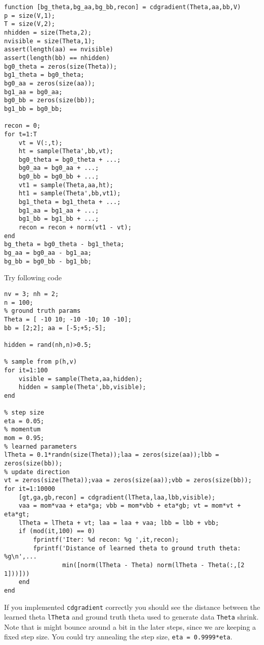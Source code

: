 \documentclass{article}
\begin{document}
\begin{verbatim}
function [bg_theta,bg_aa,bg_bb,recon] = cdgradient(Theta,aa,bb,V)
p = size(V,1);
T = size(V,2);
nhidden = size(Theta,2);
nvisible = size(Theta,1);
assert(length(aa) == nvisible)
assert(length(bb) == nhidden)
bg0_theta = zeros(size(Theta));
bg1_theta = bg0_theta;
bg0_aa = zeros(size(aa));
bg1_aa = bg0_aa;
bg0_bb = zeros(size(bb));
bg1_bb = bg0_bb;

recon = 0;
for t=1:T
    vt = V(:,t);
    ht = sample(Theta',bb,vt);
    bg0_theta = bg0_theta + ...;
    bg0_aa = bg0_aa + ...;
    bg0_bb = bg0_bb + ...;
    vt1 = sample(Theta,aa,ht);
    ht1 = sample(Theta',bb,vt1);
    bg1_theta = bg1_theta + ...;
    bg1_aa = bg1_aa + ...;
    bg1_bb = bg1_bb + ...;
    recon = recon + norm(vt1 - vt);
end
bg_theta = bg0_theta - bg1_theta;
bg_aa = bg0_aa - bg1_aa;
bg_bb = bg0_bb - bg1_bb;
\end{verbatim}




Try following code
\begin{verbatim}
nv = 3; nh = 2;
n = 100;
% ground truth params
Theta = [ -10 10; -10 -10; 10 -10];
bb = [2;2]; aa = [-5;+5;-5];

hidden = rand(nh,n)>0.5;

% sample from p(h,v)
for it=1:100
    visible = sample(Theta,aa,hidden);
    hidden = sample(Theta',bb,visible);
end

% step size
eta = 0.05;
% momentum
mom = 0.95;
% learned parameters
lTheta = 0.1*randn(size(Theta));laa = zeros(size(aa));lbb = zeros(size(bb));
% update direction
vt = zeros(size(Theta));vaa = zeros(size(aa));vbb = zeros(size(bb));
for it=1:10000
    [gt,ga,gb,recon] = cdgradient(lTheta,laa,lbb,visible);
    vaa = mom*vaa + eta*ga; vbb = mom*vbb + eta*gb; vt = mom*vt + eta*gt;
    lTheta = lTheta + vt; laa = laa + vaa; lbb = lbb + vbb;
    if (mod(it,100) == 0)
        fprintf('Iter: %d recon: %g ',it,recon);
        fprintf('Distance of learned theta to ground truth theta: %g\n',...
                min([norm(lTheta - Theta) norm(lTheta - Theta(:,[2 1]))]))
    end
end
\end{verbatim}

If you implemented \verb|cdgradient| correctly you should see the distance between the
learned theta \verb|lTheta| and ground truth theta used to generate data \verb|Theta| shrink.
Note that is might bounce around a bit in the later steps, since we are keeping a fixed
step size. You could try annealing the step size, \eg \verb|eta = 0.9999*eta|.
\end{document}

